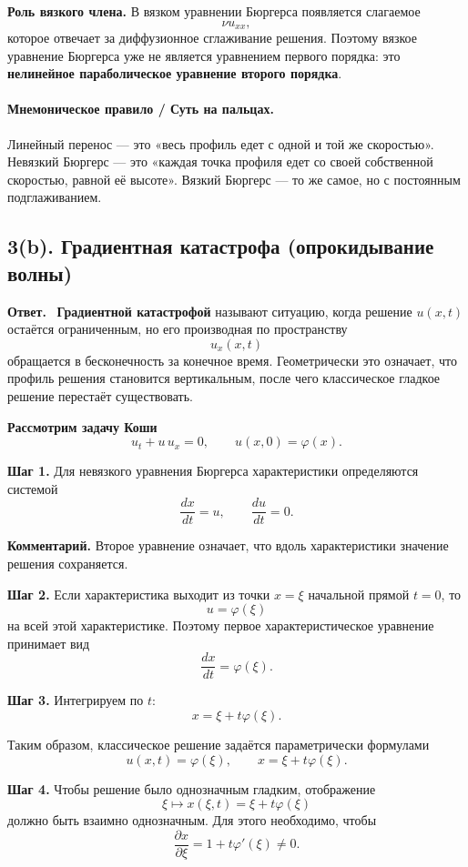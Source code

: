 \documentclass[a4paper,12pt]{article}
\newcommand{\Answer}{\textbf{Ответ.}\ }
\begin{document}
\textbf{Роль вязкого члена.}
В вязком уравнении Бюргерса появляется слагаемое
\[
\nu u_{xx},
\]
которое отвечает за диффузионное сглаживание решения. Поэтому вязкое уравнение Бюргерса уже не является уравнением первого порядка: это \textbf{нелинейное параболическое уравнение второго порядка}.

\paragraph{Мнемоническое правило / Суть на пальцах.}
Линейный перенос --- это «весь профиль едет с одной и той же скоростью». Невязкий Бюргерс --- это «каждая точка профиля едет со своей собственной скоростью, равной её высоте». Вязкий Бюргерс --- то же самое, но с постоянным подглаживанием.

\subsection*{3(b). Градиентная катастрофа (опрокидывание волны)}

\Answer
\textbf{Градиентной катастрофой} называют ситуацию, когда решение $u(x,t)$ остаётся ограниченным, но его производная по пространству
\[
u_x(x,t)
\]
обращается в бесконечность за конечное время. Геометрически это означает, что профиль решения становится вертикальным, после чего классическое гладкое решение перестаёт существовать.

\textbf{Рассмотрим задачу Коши}
\[
u_t+u\,u_x=0,
\qquad
u(x,0)=\varphi(x).
\]

\textbf{Шаг 1.} Для невязкого уравнения Бюргерса характеристики определяются системой
\[
\frac{dx}{dt}=u,
\qquad
\frac{du}{dt}=0.
\]

\textbf{Комментарий.} Второе уравнение означает, что вдоль характеристики значение решения сохраняется.

\textbf{Шаг 2.} Если характеристика выходит из точки $x=\xi$ начальной прямой $t=0$, то
\[
u=\varphi(\xi)
\]
на всей этой характеристике. Поэтому первое характеристическое уравнение принимает вид
\[
\frac{dx}{dt}=\varphi(\xi).
\]

\textbf{Шаг 3.} Интегрируем по $t$:
\[
x=\xi+t\varphi(\xi).
\]

Таким образом, классическое решение задаётся параметрически формулами
\[
u(x,t)=\varphi(\xi),
\qquad
x=\xi+t\varphi(\xi).
\]

\textbf{Шаг 4.} Чтобы решение было однозначным гладким, отображение
\[
\xi\longmapsto x(\xi,t)=\xi+t\varphi(\xi)
\]
должно быть взаимно однозначным. Для этого необходимо, чтобы
\[
\frac{\partial x}{\partial \xi}=1+t\varphi'(\xi)\ne 0.
\]
\end{document}

